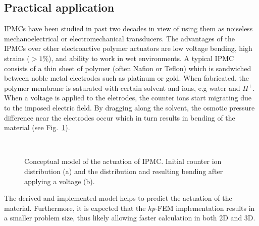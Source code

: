 \subsection{Practical application}
IPMCs have been studied in past two decades in view of using them
as noiseless mechanoelectrical or electromechanical transducers.
The advantages of the IPMCs over other electroactive polymer actuators
are low voltage bending, high strains ($>1\%$), and ability to work
in wet environments. A typical IPMC consists of a thin sheet of polymer
(often Nafion or Teflon) which is sandwiched between noble
metal electrodes such as platinum or gold. When fabricated, the polymer 
membrane is saturated with certain solvent and ions, e.g water and $H^+$.
When a voltage is applied to the eletrodes, the counter ions start
migrating due to the imposed electric field. By dragging along the solvent,
the osmotic pressure difference near the electrodes occur which in turn
results in bending of the material (see Fig.~\ref{fig:conceptual}).
\begin{figure}
  \begin{centering}
    ~
  \par\end{centering}
  \caption{\label{fig:conceptual}Conceptual model of the actuation
 	of IPMC. Initial counter ion distribution (a) and
	the distribution and resulting bending after applying a voltage (b).}
\end{figure}
The derived and implemented model helps to predict the actuation of the
material. Furthermore, it is expected that the \emph{hp}-FEM implementation
results in a smaller problem size, thus likely allowing faster calculation
in both 2D and 3D.



